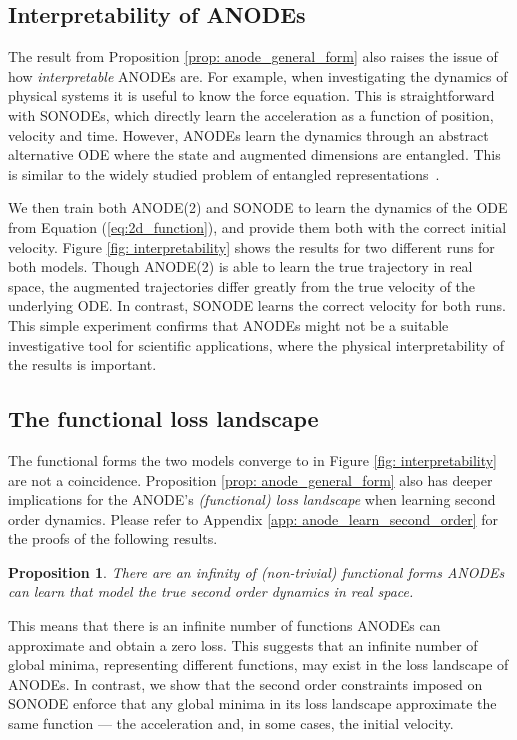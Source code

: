 \documentclass{article}
\newtheorem{proposition}[theorem]{Proposition}
\theoremstyle{remark}
\theoremstyle{definition}
\begin{document}
\subsection{Interpretability of ANODEs}
\label{sec: anodes_interpretability}

The result from Proposition \ref{prop: anode_general_form} also raises the issue of how \textit{interpretable} ANODEs are. For example, when investigating the dynamics of physical systems it is useful to know the force equation. This is straightforward with SONODEs, which directly learn the acceleration as a function of position, velocity and time. However, ANODEs learn the dynamics through an abstract alternative ODE where the state and augmented dimensions are entangled. This is similar to the widely studied problem of entangled representations~\citep{Higgins2017betaVAELB, Mathieu2019DisentanglingDI, bengio2012representation}. 

We then train both ANODE(2) and SONODE to learn the dynamics of the ODE from Equation (\ref{eq:2d_function}), and provide them both with the correct initial velocity. Figure \ref{fig: interpretability} shows the results for two different runs for both models. Though ANODE(2) is able to learn the true trajectory in real space, the augmented trajectories differ greatly from the true velocity of the underlying ODE. In contrast, SONODE learns the correct velocity for both runs. This simple experiment confirms that ANODEs might not be a suitable investigative tool for scientific applications, where the physical interpretability of the results is important.

\subsection{The functional loss landscape}
The functional forms the two models converge to in  Figure \ref{fig: interpretability} are not a coincidence. Proposition \ref{prop: anode_general_form} also has deeper implications for the ANODE's \textit{(functional) loss landscape} when learning second order dynamics. Please refer to Appendix \ref{app: anode_learn_second_order} for the proofs of the following results.  

\begin{proposition}
\label{prop: anode_infinity}
There are an infinity of (non-trivial) functional forms ANODEs can learn that model the true second order dynamics in real space.
\end{proposition}

This means that there is an infinite number of functions ANODEs can approximate and obtain a zero loss. This suggests that an infinite number of global minima, representing different functions, may exist in the loss landscape of ANODEs. In contrast, we show that the second order constraints imposed on SONODE enforce that any global minima in its loss landscape approximate the same function --- the acceleration and, in some cases, the initial velocity. 
\end{document}
